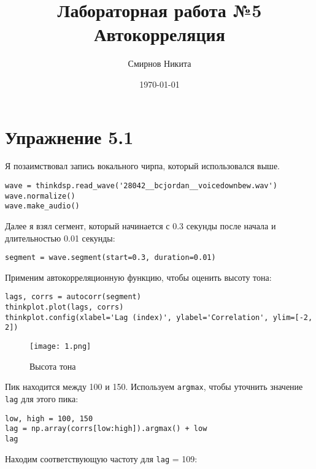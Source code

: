 \documentclass[a4paper,12pt]{report}
\title{Лабораторная работа №5\\Автокорреляция}
\author{Смирнов Никита}
\date{\today}
\begin{document}
\maketitle
\tableofcontents
\listoffigures
\lstlistoflistings

\maketitle

\chapter{Упражнение 5.1}

Я позаимствовал запись вокального чирпа, который использовался выше.

\begin{lstlisting}[caption=Вокальный чирп]
wave = thinkdsp.read_wave('28042__bcjordan__voicedownbew.wav')
wave.normalize()
wave.make_audio()
\end{lstlisting}

Далее я взял сегмент, который начинается с 0.3 секунды после начала и длительностью 0.01 секунды:

\begin{lstlisting}[caption=Первый сегмент]
segment = wave.segment(start=0.3, duration=0.01)
\end{lstlisting}

Применим автокорреляционную функцию, чтобы оценить высоту тона:

\begin{lstlisting}[caption=Оценка высоты тона]
lags, corrs = autocorr(segment)
thinkplot.plot(lags, corrs)
thinkplot.config(xlabel='Lag (index)', ylabel='Correlation', ylim=[-2, 2])
\end{lstlisting}

\begin{figure}[H]
        \centering
        \texttt{[image: 1.png]}
        \caption{Высота тона}
        \label{fig:lab5_fig1_1}
\end{figure}

Пик находится между 100 и 150. Используем \texttt{argmax}, чтобы уточнить значение \texttt{lag} для этого пика:

\begin{lstlisting}[caption=Нахождение \texttt{lag}]
low, high = 100, 150
lag = np.array(corrs[low:high]).argmax() + low
lag
\end{lstlisting}

Находим соответствующую частоту для \texttt{lag} = 109:
\end{document}
